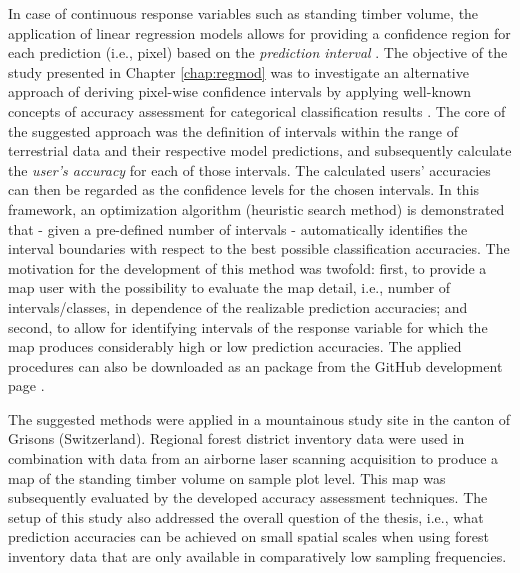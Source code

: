 In case of continuous response variables such as standing timber volume, the application of linear regression models allows for providing a confidence region for each prediction (i.e., pixel) based on the \textit{prediction interval} \citep[pp.136--139]{fahrmeir2013}. The objective of the study presented in Chapter \ref{chap:regmod} was to investigate an alternative approach of deriving pixel-wise confidence intervals by applying well-known concepts of accuracy assessment for categorical classification results \citep{congalton2008}. The core of the suggested approach was the definition of intervals within the range of terrestrial data and their respective model predictions, and subsequently calculate the \textit{user's accuracy} for each of those intervals. The calculated users' accuracies can then be regarded as the confidence levels for the chosen intervals. In this framework, an optimization algorithm (heuristic search method) is demonstrated that - given a pre-defined number of intervals - automatically identifies the interval boundaries with respect to the best possible classification accuracies. The motivation for the development of this method was twofold: first, to provide a map user with the possibility to evaluate the map detail, i.e., number of intervals/classes, in dependence of the realizable prediction accuracies; and second, to allow for identifying intervals of the response variable for which the map produces considerably high or low prediction accuracies. The applied procedures can also be downloaded as an  package from the GitHub development page \citep{github_classoptimr}.\par 

The suggested methods were applied in a mountainous study site in the canton of Grisons (Switzerland). Regional forest district inventory data were used in combination with data from an airborne laser scanning acquisition to produce a map of the standing timber volume on sample plot level. This map was subsequently evaluated by the developed accuracy assessment techniques. The setup of this study also addressed the overall question of the thesis, i.e., what prediction accuracies can be achieved on small spatial scales when using forest inventory data that are only available in comparatively low sampling frequencies.


